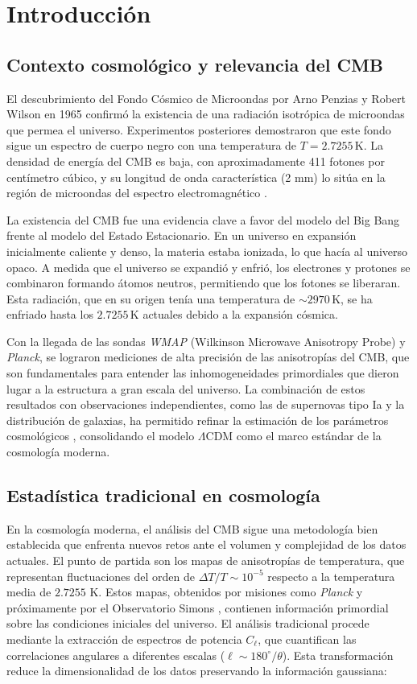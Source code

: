 \section{Introducción}
\subsection{Contexto cosmológico y relevancia del CMB}
El descubrimiento del Fondo Cósmico de Microondas por Arno Penzias y Robert Wilson en 1965 \cite{penzias} confirmó la existencia de una radiación isotrópica de microondas que permea el universo. Experimentos posteriores demostraron que este fondo sigue un espectro de cuerpo negro con una temperatura de \( T = 2.7255 \, \text{K} \). La densidad de energía del CMB es baja, con aproximadamente 411 fotones por centímetro cúbico, y su longitud de onda característica (2 mm) lo sitúa en la región de microondas del espectro electromagnético \cite{ryden}. 

La existencia del CMB fue una evidencia clave a favor del modelo del Big Bang frente al modelo del Estado Estacionario. En un universo en expansión inicialmente caliente y denso, la materia estaba ionizada, lo que hacía al universo opaco. A medida que el universo se expandió y enfrió, los electrones y protones se combinaron formando átomos neutros, permitiendo que los fotones se liberaran. Esta radiación, que en su origen tenía una temperatura de \(\sim 2970 \, \text{K}\), se ha enfriado hasta los \(2.7255 \, \text{K}\) actuales debido a la expansión cósmica.  

Con la llegada de las sondas \textit{WMAP} (Wilkinson Microwave Anisotropy Probe) y \textit{Planck}, se lograron mediciones de alta precisión de las anisotropías del CMB, que son fundamentales para entender las inhomogeneidades primordiales que dieron lugar a la estructura a gran escala del universo. La combinación de estos resultados con observaciones independientes, como las de supernovas tipo Ia y la distribución de galaxias, ha permitido refinar la estimación de los parámetros cosmológicos \cite{planck2018}, consolidando el modelo \(\Lambda\)CDM como el marco estándar de la cosmología moderna.

\subsection{Estadística tradicional en cosmología}
En la cosmología moderna, el análisis del CMB sigue una metodología bien establecida que enfrenta nuevos retos ante el volumen y complejidad de los datos actuales. El punto de partida son los mapas de anisotropías de temperatura, que representan fluctuaciones del orden de $\Delta T/T \sim 10^{-5}$ respecto a la temperatura media de $2.7255$ K. Estos mapas, obtenidos por misiones como \textit{Planck} \cite{planck2018} y próximamente por el Observatorio Simons \cite{simons2019}, contienen información primordial sobre las condiciones iniciales del universo. El análisis tradicional procede mediante la extracción de espectros de potencia $C_\ell$, que cuantifican las correlaciones angulares a diferentes escalas ($\ell \sim 180^\circ/\theta$). Esta transformación reduce la dimensionalidad de los datos preservando la información gaussiana:

